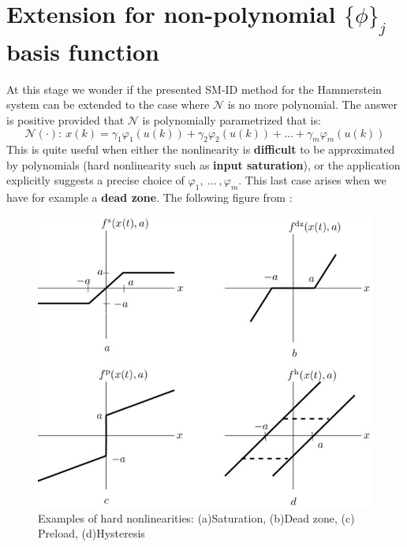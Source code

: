 \section{Extension for non-polynomial $\{\phi\}_j$ basis function}
At this stage we wonder if the presented SM-ID method for the Hammerstein system can be extended to the case where $\mathcal{N}$ is no more polynomial. The answer is positive provided that $\mathcal{N}$ is polynomially parametrized that is: 
\begin{equation}
    \mathcal{N}(\cdot): \ x(k)=\gamma_1{\varphi_1(u(k))}+\gamma_2{\varphi_2(u(k))}+...+\gamma_m{\varphi_m(u(k))}
\end{equation}
This is quite useful when either the nonlinearity is \textbf{difficult} to be approximated by polynomials (hard nonlinearity such as \textbf{input saturation}), or the application explicitly suggests a precise choice of $\varphi_1, \ ... \ , \varphi_m$. This last case arises when we have for example a \textbf{dead zone}.
The following figure from \cite{pupeikis2003identification}: 
\begin{figure}[h]
    \centering
    \includegraphics[scale=1.4]{img/hardNL.jpg}
    \caption{Examples of hard nonlinearities: (a)Saturation, (b)Dead zone, (c) Preload, (d)Hysteresis}
\end{figure} 


